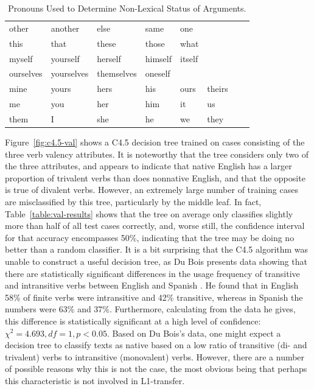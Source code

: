 \documentclass[main.tex]{subfiles}
\begin{document}
\begin{table}[ht]
\small
\centering
\caption{Pronouns Used to Determine Non-Lexical Status of Arguments.}
\begin{tabular}{ l l l l l l l l }
\toprule

other & another & else & same & one \\
this & that & these & those & what \\
myself & yourself & herself & himself & itself \\
ourselves & yourselves &themselves & oneself \\
mine & yours & hers & his & ours & theirs \\
me & you & her & him & it & us \\
them & I & she & he & we & they \\

\bottomrule
\end{tabular}
\label{table:pronouns}
\end{table}

Figure~\ref{fig:c4.5-val} shows a C4.5 decision tree trained on cases consisting of the three verb valency attributes. It is noteworthy that the tree considers only two of the three attributes, and appears to indicate that native English has a larger proportion of trivalent verbs than does nonnative English, and that the opposite is true of divalent verbs. However, an extremely large number of training cases are misclassified by this tree, particularly by the middle leaf. In fact, Table~\ref{table:val-results} shows that the tree on average only classifies slightly more than half of all test cases correctly, and, worse still, the confidence interval for that accuracy encompasses 50\%, indicating that the tree may be doing no better than a random classifier. It is a bit surprising that the C4.5 algorithm was unable to construct a useful decision tree, as Du Bois presents data showing that there are statistically significant differences in the usage frequency of transitive and intransitive verbs between English and Spanish \citep[Table~2.3]{dubois:2003}. He found that in English 58\% of finite verbs were intransitive and 42\% transitive, whereas in Spanish the numbers were 63\% and 37\%. Furthermore, calculating from the data he gives, this difference is statistically significant at a high level of confidence: $\chi^2=4.693, df=1, p<0.05$. Based on Du Bois's data, one might expect a decision tree to classify texts as native based on a low ratio of transitive (di- and trivalent) verbs to intransitive (monovalent) verbs. However, there are a number of possible reasons why this is not the case, the most obvious being that perhaps this characteristic is not involved in L1-transfer.
\end{document}
